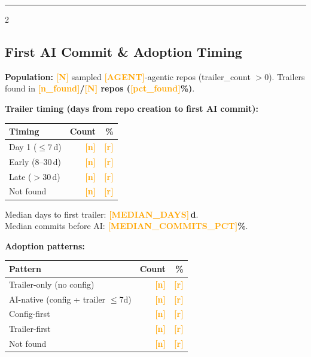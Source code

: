 \documentclass[10pt,a4paper]{article}
\newcommand{\FILLIN}[1]{\textcolor{orange}{\textbf{[#1]}}}
\begin{document}
\vspace{4pt}
\hrule
\vspace{4pt}

\begin{multicols}{2}
\footnotesize

\subsection*{First AI Commit \& Adoption Timing}
\textbf{Population:} \FILLIN{N} sampled \FILLIN{AGENT}-agentic repos
(trailer\_count $> 0$). Trailers found in \textbf{\FILLIN{n\_found}/\FILLIN{N}
repos (\FILLIN{pct\_found}\%)}.

\vspace{3pt}
\textbf{Trailer timing (days from repo creation to first AI commit):}

\vspace{2pt}
\begin{tabular}{@{}lrr@{}}
\toprule
Timing & Count & \% \\
\midrule
Day 1 ($\leq$7\,d)  & \FILLIN{n} & \FILLIN{r} \\
Early (8--30\,d)    & \FILLIN{n} & \FILLIN{r} \\
Late ($>$30\,d)     & \FILLIN{n} & \FILLIN{r} \\
Not found           & \FILLIN{n} & \FILLIN{r} \\
\bottomrule
\end{tabular}

\vspace{2pt}
Median days to first trailer: \textbf{\FILLIN{MEDIAN\_DAYS}\,d}.\\
Median commits before AI: \textbf{\FILLIN{MEDIAN\_COMMITS\_PCT}\%}.

\columnbreak

\textbf{Adoption patterns:}

\vspace{2pt}
\begin{tabular}{@{}lrr@{}}
\toprule
Pattern & Count & \% \\
\midrule
Trailer-only (no config)             & \FILLIN{n} & \FILLIN{r} \\
AI-native (config + trailer $\leq$7d)& \FILLIN{n} & \FILLIN{r} \\
Config-first                         & \FILLIN{n} & \FILLIN{r} \\
Trailer-first                        & \FILLIN{n} & \FILLIN{r} \\
Not found                            & \FILLIN{n} & \FILLIN{r} \\
\bottomrule
\end{tabular}


\end{multicols}
\end{document}

